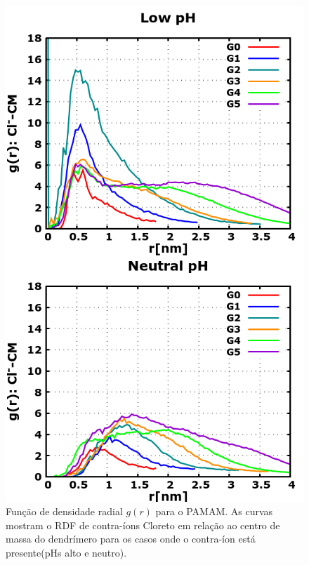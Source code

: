 \begin{figure}[ht!]
\centering
\includegraphics[scale=0.3]{images/PME/PAMAMClRDF.png}
\caption{Função de densidade radial $g(r)$ para o PAMAM. As curvas mostram o RDF de contra-íons Cloreto em relação ao centro de massa do dendrímero para os casos onde o contra-íon está presente(pHs alto e neutro).}
\label{supfig:PAMAMClRDF}
\end{figure}